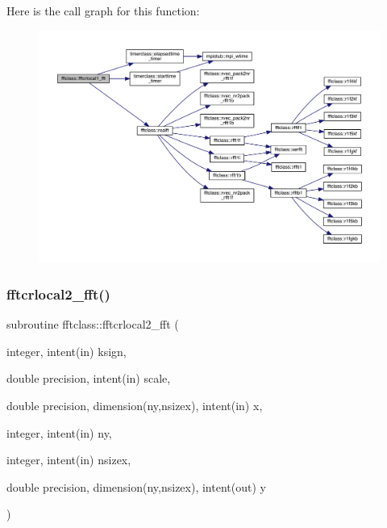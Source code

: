 Here is the call graph for this function\+:\nopagebreak
\begin{figure}[H]
\begin{center}
\leavevmode
\includegraphics[width=350pt]{namespacefftclass_a25ecfa928dd28501b9c251c1e887996b_cgraph}
\end{center}
\end{figure}
\mbox{\label{namespacefftclass_a62d05d7b0980c823708d03f4a1520c1e}} 
\subsubsection{\texorpdfstring{fftcrlocal2\_fft()}{fftcrlocal2\_fft()}}
{\footnotesize\ttfamily subroutine fftclass\+::fftcrlocal2\+\_\+fft (\begin{DoxyParamCaption}\item[{integer, intent(in)}]{ksign,  }\item[{double precision, intent(in)}]{scale,  }\item[{double precision, dimension(ny,nsizex), intent(in)}]{x,  }\item[{integer, intent(in)}]{ny,  }\item[{integer, intent(in)}]{nsizex,  }\item[{double precision, dimension(ny,nsizex), intent(out)}]{y }\end{DoxyParamCaption})}

